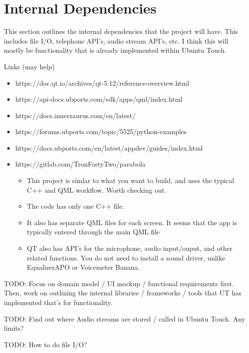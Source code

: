 \section{Internal Dependencies}

This section outlines the internal dependencies that the project will have. This includes file I/O, telephone API's, audio stream API's, etc. I think this will mostly be functionality that is already implemented within Ubuntu Touch.

Links (may help)
\begin{itemize}
	\item https://doc.qt.io/archives/qt-5.12/reference-overview.html
	\item https://api-docs.ubports.com/sdk/apps/qml/index.html
	\item https://docs.innerzaurus.com/en/latest/
	\item https://forums.ubports.com/topic/5525/python-examples
	\item https://docs.ubports.com/en/latest/appdev/guides/index.html
	\item https://gitlab.com/TronFortyTwo/parabola
	\begin{itemize}
		\item This project is simlar to what you want to build, and uses the typical C++ and QML workflow. Worth checking out.
		\item The code has only one C++ file.
		\item It also has separate QML files for each screen. It seems that the app is typically entered through the main QML file
		\item QT also has API's for the microphone, audio input/ouput, and other related functions. You do not need to install a sound driver, unlike EqualizerAPO or Voicemeter Banana.
	\end{itemize}
\end{itemize}


TODO: Focus on domain model / UI mockup / functional requirements first. Then, work on outlining the internal libraries / frameworks / tools that UT has implemented that's for functionality.

TODO: Find out where Audio streams are stored / called in Ubuntu Touch. Any limits?

TODO: How to do file I/O?

